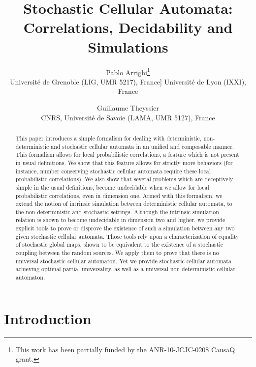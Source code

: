 \documentclass[submission]{fundam}
\title{Stochastic Cellular Automata:\\ Correlations, Decidability and Simulations}
\author{	Pablo Arrighi\thanks{This work has been partially funded by the ANR-10-JCJC-0208 CausaQ grant.}\\
			{Université de Grenoble (LIG, UMR 5217), France}\-1mm]
        		{Université de Lyon (IXXI), France}
 	\and 	Guillaume Theyssier\\
			{CNRS, Université de Savoie (LAMA, UMR 5127), France}
      }
\begin{document}
\maketitle

\begin{abstract}
This paper introduces a simple formalism for dealing with deterministic, non-deterministic and stochastic cellular automata in an unified and composable manner. This formalism allows for local probabilistic correlations, a feature which is not present in usual definitions. We show that this feature allows for strictly more behaviors (for instance, number conserving stochastic cellular automata require these local probabilistic correlations). We also show that several problems which are deceptively simple in the usual definitions, become undecidable when we allow for local probabilistic correlations, even in dimension one. Armed with this formalism, we extend the notion of intrinsic simulation between deterministic cellular automata, to the non-deterministic and stochastic settings. Although the intrinsic simulation relation is shown to become undecidable in dimension two and higher, we provide explicit tools to prove or disprove the existence of such a simulation between any two given stochastic cellular automata. Those tools rely upon a characterization of equality of stochastic global maps, shown to be equivalent to the existence of a stochastic coupling between the random sources. We apply them to prove that there is no universal stochastic cellular automaton. Yet we provide stochastic cellular automata achieving optimal partial universality, as well as a universal non-deterministic cellular automaton.
\end{abstract}


\section{Introduction} 
\end{document}

